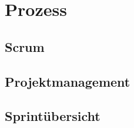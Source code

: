 \chapter{Prozess}
\label{ch:process}

\section{Scrum}
\label{sec:scrum}

\section{Projektmanagement}
\label{sec:projectmanagement}

\section{Sprintübersicht}
\label{sec:sprintoverview}
